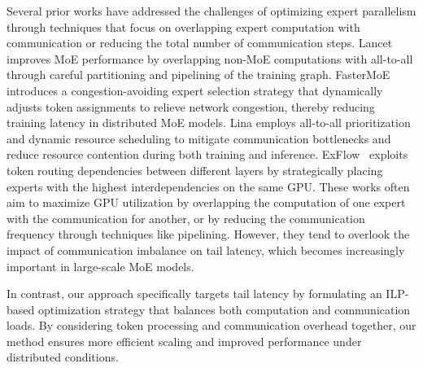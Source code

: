%
Several prior works have addressed the challenges of optimizing expert parallelism through techniques that focus on overlapping expert computation with communication or reducing the total number of communication steps.
%
Lancet\cite{jiang2024lancet} improves MoE performance by overlapping non-MoE computations with all-to-all through careful partitioning and pipelining of the training graph.
%
FasterMoE\cite{fastermoe} introduces a congestion-avoiding expert selection strategy that dynamically adjusts token assignments to relieve network congestion, thereby reducing training latency in distributed MoE models. 
%
Lina\cite{li2023accelerating} employs all-to-all prioritization and dynamic resource scheduling to mitigate communication bottlenecks and reduce resource contention during both training and inference. 
%
ExFlow~\cite{exflow} exploits token routing dependencies between different layers by strategically placing experts with the highest interdependencies on the same GPU. 
%
These works often aim to maximize GPU utilization by overlapping the computation of one expert with the communication for another, or by reducing the communication frequency through techniques like pipelining. 
%
However, they tend to overlook the impact of communication imbalance on tail latency, which becomes increasingly important in large-scale MoE models. 
%

In contrast, our approach specifically targets tail latency by formulating an ILP-based optimization strategy that balances both computation and communication loads. By considering token processing and communication overhead together, our method ensures more efficient scaling and improved performance under distributed conditions.